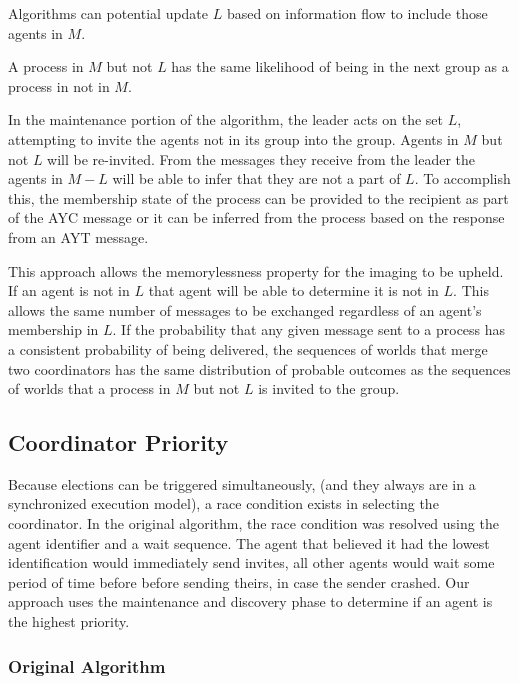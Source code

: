 Algorithms can potential update $L$ based on information flow to include those agents in $M$.

\begin{thm}
A process in $M$ but not $L$ has the same likelihood of being in the next group as a process in not in $M$.
\end{thm}

In the maintenance portion of the algorithm, the leader acts on the set $L$, attempting to invite the agents not in its group into the group. Agents in $M$ but not $L$ will be re-invited. From the messages they receive from the leader the agents in $M-L$ will be able to infer that they are not a part of $L$. To accomplish this, the membership state of the process can be provided to the recipient as part of the \ac{AYC} message or it can be inferred from the process based on the response from an \ac{AYT} message.

This approach allows the memorylessness property for the imaging to be upheld. If an agent is not in $L$ that agent will be able to determine it is not in $L$. This allows the same number of messages to be exchanged regardless of an agent's membership in $L$. If the probability that any given message sent to a process has a consistent probability of being delivered, the sequences of worlds that merge two coordinators has the same distribution of probable outcomes as the sequences of worlds that a process in $M$ but not $L$ is invited to the group.

\subsection{Coordinator Priority}

Because elections can be triggered simultaneously, (and they always are in a synchronized execution model), a race condition exists in selecting the coordinator. In the original algorithm, the race condition was resolved using the agent identifier and a wait sequence. The agent that believed it had the lowest identification would immediately send invites, all other agents would wait some period of time before before sending theirs, in case the sender crashed. Our approach uses the maintenance and discovery phase to determine if an agent is the highest priority.

\subsubsection{Original Algorithm}


